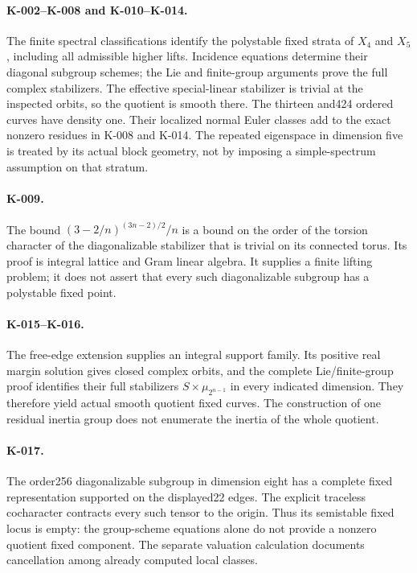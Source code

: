 \paragraph{K-002--K-008 and K-010--K-014.}
The finite spectral classifications identify the polystable
fixed strata of $X_4$ and $X_5$, including all admissible higher
lifts.  Incidence equations determine their diagonal subgroup
schemes; the Lie and finite-group arguments prove the full
complex stabilizers.  The effective special-linear stabilizer
is trivial at the inspected orbits, so the quotient is smooth
there.  The thirteen and424 ordered curves have density one.
Their localized normal Euler classes add to the exact nonzero
residues in K-008 and K-014.  The repeated eigenspace in dimension
five is treated by its actual block geometry, not by imposing a
simple-spectrum assumption on that stratum.

\paragraph{K-009.}
The bound
$(3-2/n)^{(3n-2)/2}/n$ is a bound on the order of the torsion
character of the diagonalizable stabilizer that is trivial on
its connected torus.  Its proof is integral lattice and Gram
linear algebra.  It supplies a finite lifting problem; it does
not assert that every such diagonalizable subgroup has a
polystable fixed point.

\paragraph{K-015--K-016.}
The free-edge extension supplies an integral support family.
Its positive real margin solution gives closed complex orbits,
and the complete Lie/finite-group proof identifies their full
stabilizers $S\times\mu_{2^{n-1}}$ in every indicated dimension.
They therefore yield actual smooth quotient fixed curves.  The
construction of one residual inertia group does not enumerate
the inertia of the whole quotient.

\paragraph{K-017.}
The order256 diagonalizable subgroup in dimension eight has a
complete fixed representation supported on the displayed22 edges.
The explicit traceless cocharacter contracts every such tensor
to the origin.  Thus its semistable fixed locus is empty: the
group-scheme equations alone do not provide a nonzero quotient
fixed component.  The separate valuation calculation documents
cancellation among already computed local classes.

